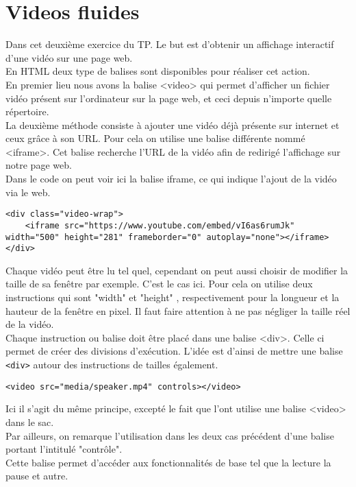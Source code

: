 \section{Videos fluides}
Dans cet deuxième exercice du TP. Le but est d'obtenir un affichage interactif d'une vidéo sur une page web.\\
En HTML deux type de balises sont disponibles pour réaliser cet action.\\
En premier lieu nous avons la balise <video> qui permet d'afficher un fichier vidéo présent sur l'ordinateur sur la page web, et ceci depuis n'importe quelle répertoire.\\

La deuxième méthode consiste à ajouter une vidéo déjà présente sur internet et ceux grâce à son URL. Pour cela on utilise une balise différente nommé <iframe>. Cet balise recherche l'URL de la vidéo afin de redirigé l'affichage sur notre page web.\\

Dans le code on peut voir ici la balise iframe, ce qui indique l'ajout de la vidéo via le web.
\begin{verbatim}
<div class="video-wrap">
	<iframe src="https://www.youtube.com/embed/vI6as6rumJk" width="500" height="281" frameborder="0" autoplay="none"></iframe>
</div>
\end{verbatim}

Chaque vidéo peut être lu tel quel, cependant on peut aussi choisir de modifier la taille de sa fenêtre par exemple. C'est le cas ici. Pour cela on utilise deux instructions qui sont "width" et "height" , respectivement pour la longueur et la hauteur de la fenêtre en pixel. Il faut faire attention à ne pas négliger la taille réel de la vidéo.\\
Chaque instruction ou balise doit être placé dans une balise <div>. Celle ci permet de créer des divisions d'exécution. L'idée est d'ainsi de mettre une balise \texttt{<div>} autour des instructions de tailles également.

\begin{verbatim}
<video src="media/speaker.mp4" controls></video>
\end{verbatim}

Ici il s'agit du même principe, excepté le fait que l'ont utilise une balise <video> dans le sac.\\
Par ailleurs, on remarque l'utilisation dans les deux cas précédent d'une balise portant l'intitulé "contrôle".\\
Cette balise permet d'accéder aux fonctionnalités de base tel que la lecture  la pause et autre.\\

